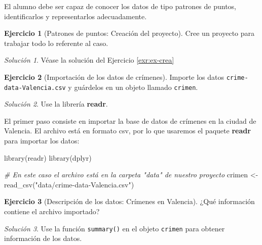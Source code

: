\documentclass[
]{book}
\newenvironment{Shaded}{\begin{snugshade}}{\end{snugshade}}
\newcommand{\CommentTok}[1]{\textcolor[rgb]{0.56,0.35,0.01}{\textit{#1}}}
\newcommand{\FunctionTok}[1]{\textcolor[rgb]{0.00,0.00,0.00}{#1}}
\newcommand{\NormalTok}[1]{#1}
\newcommand{\OtherTok}[1]{\textcolor[rgb]{0.56,0.35,0.01}{#1}}
\newcommand{\StringTok}[1]{\textcolor[rgb]{0.31,0.60,0.02}{#1}}
\theoremstyle{definition}
\theoremstyle{definition}
\theoremstyle{definition}
\newtheorem{exercise}{Ejercicio}[chapter]
\theoremstyle{definition}
\theoremstyle{remark}
\newtheorem*{solution}{Solución}
\begin{document}
El alumno debe ser capaz de conocer los datos de tipo patrones de puntos,
identificarlos y representarlos adecuadamente.

\begin{exercise}[Patrones de puntos: Creación del proyecto]
\protect\hypertarget{exr:ex24}{}\label{exr:ex24}Cree un proyecto para trabajar todo lo referente al caso.
\end{exercise}

\begin{solution}
Véase la solución del Ejercicio \ref{exr:ex-crea}
\end{solution}

\begin{exercise}[Importación de los datos de crímenes]
\protect\hypertarget{exr:ex25}{}\label{exr:ex25}Importe los datos \texttt{crime-data-Valencia.csv} y guárdelos en un objeto llamado
\texttt{crimen}.
\end{exercise}

\begin{solution}
Use la librería \textbf{readr}.
\end{solution}

El primer paso consiste en importar la base de datos de crímenes en la ciudad de
Valencia. El archivo está en formato csv, por lo que usaremos el paquete
\textbf{readr} \citep{R-readr} para importar los datos:

\begin{Shaded}
\begin{Highlighting}[]
\FunctionTok{library}\NormalTok{(readr)}
\FunctionTok{library}\NormalTok{(dplyr)}

\CommentTok{\# En este caso el archivo está en la carpeta "data" de nuestro proyecto}
\NormalTok{crimen }\OtherTok{\textless{}{-}} \FunctionTok{read\_csv}\NormalTok{(}\StringTok{"data/crime{-}data{-}Valencia.csv"}\NormalTok{)}
\end{Highlighting}
\end{Shaded}

\begin{exercise}[Descripción de los datos: Crímenes en Valencia]
\protect\hypertarget{exr:ex26}{}\label{exr:ex26}¿Qué información contiene el archivo importado?
\end{exercise}

\begin{solution}
Use la función \texttt{summary()} en el objeto \texttt{crimen} para obtener información de los
datos.
\end{solution}
\end{document}
